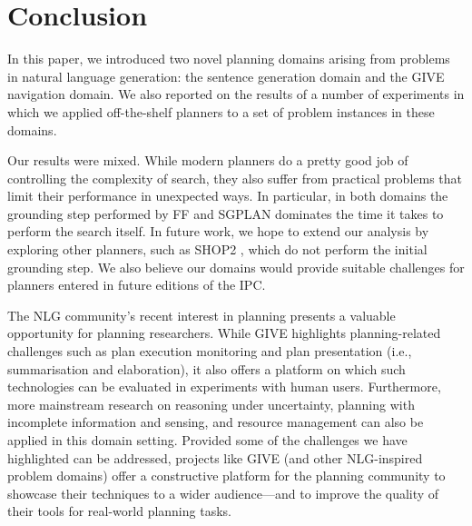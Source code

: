 \section{Conclusion} \label{sec:conclusion}

In this paper, we introduced two novel planning domains arising from
problems in natural language generation: the sentence generation
domain and the GIVE navigation domain. We also reported on the results
of a number of experiments in which we applied off-the-shelf planners
to a set of problem instances in these domains.

Our results were mixed. While modern planners do a pretty good job of
controlling the complexity of search, they also suffer from practical
problems that limit their performance in unexpected ways. In particular, in
both domains the grounding step performed by FF and SGPLAN dominates the
time it takes to perform the search itself. In future work, we hope to
extend our analysis by exploring other planners, such as SHOP2
\cite{DBLP:journals/jair/NauAIKMWY03}, which do not perform the initial
grounding step. We also believe our domains would provide suitable
challenges for planners entered in future editions of the IPC.

The NLG community's recent interest in planning presents a valuable
opportunity for planning researchers.  While GIVE highlights
planning-related challenges such as plan execution monitoring and plan
presentation (i.e., summarisation and elaboration), it also offers a
platform on which such technologies can be evaluated in experiments with
human users.  Furthermore, more mainstream research on reasoning under
uncertainty, planning with incomplete information and sensing, and resource
management can also be applied in this domain setting. Provided some of the
challenges we have highlighted can be addressed, projects like GIVE (and
other NLG-inspired problem domains) offer a constructive platform for the
planning community to showcase their techniques to a wider audience---and
to improve the quality of their tools for real-world planning tasks. 


